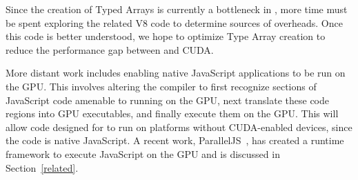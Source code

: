 Since the creation of Typed Arrays is currently a bottleneck in \namens, more
time must be spent exploring the related V8 code to determine sources
of overheads. Once this code is better understood, we hope to optimize Type
Array creation to reduce the performance gap between \name and CUDA.

More distant work includes enabling native JavaScript applications to be run on
the GPU. This involves altering the compiler to first recognize sections of JavaScript
code amenable to running on the GPU, next translate these code regions into GPU
executables, and finally execute them on the GPU. This will allow code
designed for \name to run on platforms without CUDA-enabled devices, since the
code is native JavaScript.  A recent work, ParallelJS~\cite{parallelJS}, has
created a runtime framework to execute JavaScript on the GPU and is discussed in
Section~\ref{related}.


